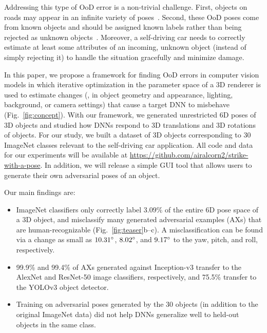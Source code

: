 \documentclass[10pt,twocolumn,letterpaper]{article}
\begin{document}
Addressing this type of OoD error is a non-trivial challenge.
First, objects on roads may appear in an infinite variety of poses~\cite{tesla2016killed,uber2017killed}.
Second, these OoD poses come from known objects and should be assigned known labels rather than being rejected as unknown objects~\cite{hendrycks2016baseline,scheirer2013toward}.
Moreover, a self-driving car needs to correctly estimate at least some attributes of an incoming, unknown object (instead of simply rejecting it) to handle the situation gracefully and minimize damage.







In this paper, we propose a framework for finding OoD errors in computer vision models in which iterative optimization in the parameter space of a 3D renderer is used to estimate changes (\eg, in object geometry and appearance, lighting, background, or camera settings) that cause a target DNN to misbehave (Fig.~\ref{fig:concept}).
With our framework, we generated unrestricted 6D poses of 3D objects and studied how DNNs respond to 3D translations and 3D rotations of objects.
For our study, we built a dataset of 3D objects corresponding to 30 ImageNet classes relevant to the self-driving car application.
All code and data for our experiments will be available at 
\url{https://github.com/airalcorn2/strike-with-a-pose}.
In addition, we will release a simple GUI tool that allows users to generate their own adversarial poses of an object.

Our main findings are:

\begin{itemize}
    \item ImageNet classifiers only correctly label $3.09\%$ of the entire 6D pose space of a 3D object, and misclassify many generated adversarial examples (AXs) that are human-recognizable (Fig.~\ref{fig:teaser}b--c).
    A misclassification can be found via a change as small as $10.31\degree$, $8.02\degree$, and $9.17\degree$ to the yaw, pitch, and roll, respectively.
    \item 99.9\% and 99.4\% of AXs generated against Inception-v3 transfer to the AlexNet and ResNet-50 image classifiers, respectively, and 75.5\% transfer to the YOLOv3 object detector.

    \item Training on adversarial poses generated by the 30 objects (in addition to the original ImageNet data) did not help DNNs generalize well to held-out objects in the same class.
\end{itemize}
\end{document}
